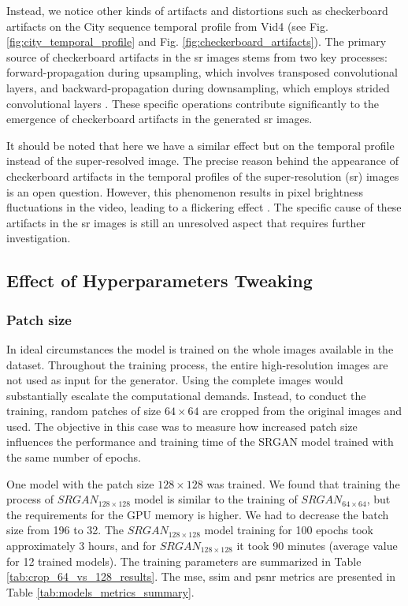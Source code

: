 \documentclass[conference]{IEEEtran}
\begin{document}
Instead, we notice other kinds of artifacts and distortions such as checkerboard artifacts on the City sequence temporal profile from Vid4 (see Fig. \ref{fig:city_temporal_profile} and Fig. \ref{fig:checkerboard_artifacts}). The primary source of checkerboard artifacts in the \acrshort{sr} images stems from two key processes: forward-propagation during upsampling, which involves transposed convolutional layers, and backward-propagation during downsampling, which employs strided convolutional layers \cite{checkerboard_2020}. These specific operations contribute significantly to the emergence of checkerboard artifacts in the generated \acrshort{sr} images.

It should be noted that here we have a similar effect but on the temporal profile instead of the super-resolved image. The precise reason behind the appearance of checkerboard artifacts in the temporal profiles of the super-resolution (\acrshort{sr}) images is an open question. However, this phenomenon results in pixel brightness fluctuations in the video, leading to a flickering effect \cite{frvsr_2018}. The specific cause of these artifacts in the \acrshort{sr} images is still an unresolved aspect that requires further investigation.

\subsection{Effect of Hyperparameters Tweaking}

\subsubsection{Patch size}

In ideal circumstances the model is trained on the whole images available in the dataset. Throughout the training process, the entire high-resolution images are not used as input for the generator. Using the complete images would substantially escalate the computational demands. Instead, to conduct the training, random patches of size $64 \times 64$ are cropped from the original images and used. The objective in this case was to measure how increased patch size influences the performance and training time of the SRGAN model trained with the same number of epochs.

One model with the patch size $128 \times 128$ was trained. We found that training the process of $SRGAN_{128 \times 128}$ model is similar to the training of $SRGAN_{64 \times 64}$, but the requirements for the GPU memory is higher. We had to decrease the batch size from 196 to 32. The  $SRGAN_{128 \times 128}$ model training for 100 epochs took approximately 3 hours, and for $SRGAN_{128 \times 128}$  it took 90 minutes (average value for 12 trained models). The training parameters are summarized in Table \ref{tab:crop_64_vs_128_results}. The \acrshort{mse}, \acrshort{ssim} and \acrshort{psnr} metrics are presented in Table \ref{tab:models_metrics_summary}.
\end{document}
